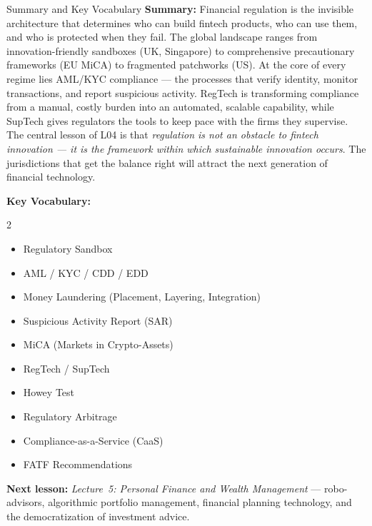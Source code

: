 \begin{frame}{Summary and Key Vocabulary}
  \textbf{Summary:} Financial regulation is the invisible architecture that
  determines who can build fintech products, who can use them, and who is
  protected when they fail. The global landscape ranges from innovation-friendly
  sandboxes (UK, Singapore) to comprehensive precautionary frameworks (EU MiCA)
  to fragmented patchworks (US). At the core of every regime lies AML/KYC
  compliance --- the processes that verify identity, monitor transactions, and
  report suspicious activity. RegTech is transforming compliance from a
  manual, costly burden into an automated, scalable capability, while SupTech
  gives regulators the tools to keep pace with the firms they supervise. The
  central lesson of L04 is that \textit{regulation is not an obstacle to
  fintech innovation --- it is the \textcolor{mlpurple}{framework within which
  sustainable innovation occurs}}. The jurisdictions that get the balance right
  will attract the next generation of financial technology.

  \vspace{0.5em}
  \textbf{Key Vocabulary:}
  \begin{multicols}{2}
    \begin{itemize}
      \item Regulatory Sandbox
      \item AML / KYC / CDD / EDD
      \item Money Laundering (Placement, Layering, Integration)
      \item Suspicious Activity Report (SAR)
      \item MiCA (Markets in Crypto-Assets)
      \item RegTech / SupTech
      \item Howey Test
      \item Regulatory Arbitrage
      \item Compliance-as-a-Service (CaaS)
      \item FATF Recommendations
    \end{itemize}
  \end{multicols}

  \vspace{0.3em}
  \textbf{Next lesson:} \textit{Lecture~5: Personal Finance and Wealth
  Management} --- robo-advisors, algorithmic portfolio management,
  financial planning technology, and the democratization of investment advice.
\end{frame}


